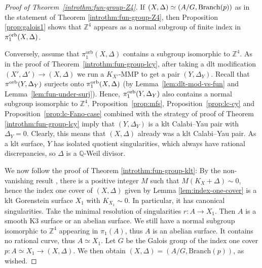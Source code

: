 \documentclass{amsart}
\newcommand{\qq}{\mathbb{Q}}
\newcommand{\zz}{\mathbb{Z}}
\theoremstyle{definition}
\theoremstyle{remark}
\numberwithin{equation}{section}
\begin{document}
\begin{proof}[Proof of Theorem~\ref{introthm:fun-group-Z4}]
If $(X,\Delta)\simeq (A/G,{\rm Branch}(p))$ as in the statement of Theorem \ref{introthm:fun-group-Z4}, then Proposition \ref{prop:galois1} shows that $\zz^4$ appears as a normal subgroup of finite index in $\pi_1^{\rm orb}(X,\Delta)$. 

Conversely, assume that $\pi_1^{\mathrm{orb}}(X,\Delta)$ contains a subgroup isomorphic to $\zz^4$. 
As in the proof of Theorem~\ref{introthm:fun-group-lcy}, after taking a dlt modification $(X',\Delta')\rightarrow (X,\Delta)$ we run a $K_{X'}$-MMP to get a pair $(Y,\Delta_Y)$. Recall that $\pi^{\rm{orb}}(Y,\Delta_Y)$ surjects onto $\pi_1^{\rm{orb}}(X,\Delta)$ (by Lemma~\ref{lem:dlt-mod-vs-fun} and Lemma~\ref{lem:fun-under-surj}). Hence, $\pi_1^{\rm{orb}}(Y,\Delta_Y)$ also contains a normal subgroup isomorphic to $\mathbb{Z}^4$. Proposition~\ref{prop:mfs}, Proposition~\ref{prop:lc-cy} and Proposition~\ref{prop:lc-Fano-case} combined with the strategy of proof of Theorem \ref{introthm:fun-group-lcy} imply that $(Y,\Delta_Y)$ is a klt Calabi--Yau pair with $\Delta_Y=0$. Clearly, this means that $(X,\Delta)$ already was a klt Calabi--Yau pair. As a klt surface, $Y$ has isolated quotient singularities, which always have rational discrepancies, so $\Delta$ is a $\qq$-Weil divisor. 

We now follow the proof of Theorem \ref{introthm:fun-group-klt}: By the non-vanishing result \cite[V.4.9 Corollary]{Nak04}, there is a positive integer $M$ such that $M(K_{X}+\Delta)\sim 0$, hence the index one cover of $(X,\Delta)$ given by Lemma \ref{lem:index-one-cover} is a klt Gorenstein surface $X_1$ with $K_{X_1}\sim 0$. In particular, it has canonical singularities. Take the minimal resolution of singularities $r:A\rightarrow X_1$. Then $A$ is a smooth K3 surface or an abelian surface.
We still have a normal subgroup isomorphic to $\zz^4$ appearing in $\pi_1(A)$, thus $A$ is an abelian surface. It contains no rational curve, thus $A\simeq X_1$. Let $G$ be the Galois group of the index one cover $p: A\simeq X_1 \to (X,\Delta)$. We then obtain $(X,\Delta)=(A/G,\mathrm{Branch}(p))$, as wished.
\end{proof}
\end{document}
